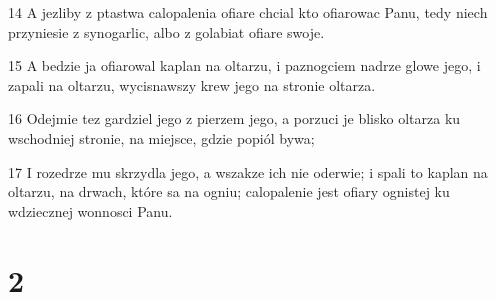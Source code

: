\par 14 A jezliby z ptastwa calopalenia ofiare chcial kto ofiarowac Panu, tedy niech przyniesie z synogarlic, albo z golabiat ofiare swoje.
\par 15 A bedzie ja ofiarowal kaplan na oltarzu, i paznogciem nadrze glowe jego, i zapali na oltarzu, wycisnawszy krew jego na stronie oltarza.
\par 16 Odejmie tez gardziel jego z pierzem jego, a porzuci je blisko oltarza ku wschodniej stronie, na miejsce, gdzie popiól bywa;
\par 17 I rozedrze mu skrzydla jego, a wszakze ich nie oderwie; i spali to kaplan na oltarzu, na drwach, które sa na ogniu; calopalenie jest ofiary ognistej ku wdziecznej wonnosci Panu.

\chapter{2}

